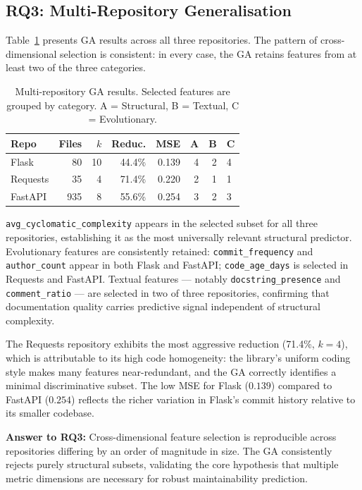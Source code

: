 \documentclass[11pt,a4paper]{article}
\begin{document}
\subsection{RQ3: Multi-Repository Generalisation}
\label{subsec:rq3}

Table~\ref{tab:multirepo} presents GA results across all three repositories.
The pattern of cross-dimensional selection is consistent: in every case, the
GA retains features from at least two of the three categories.

\begin{table}[!htbp]
\centering
\caption{Multi-repository GA results. Selected features are grouped by category.
         A = Structural, B = Textual, C = Evolutionary.}
\label{tab:multirepo}
\renewcommand{\arraystretch}{1.2}
\begin{tabular}{@{}lrrrrrrl@{}}
\toprule
\textbf{Repo} & \textbf{Files} & \textbf{$k$} & \textbf{Reduc.} &
\textbf{MSE} & \textbf{A} & \textbf{B} & \textbf{C} \\
\midrule
Flask    &  80  & 10 & 44.4\% & 0.139 & 4 & 2 & 4 \\
Requests &  35  &  4 & 71.4\% & 0.220 & 2 & 1 & 1 \\
FastAPI  & 935  &  8 & 55.6\% & 0.254 & 3 & 2 & 3 \\
\bottomrule
\end{tabular}
\end{table}

\texttt{avg\_cyclomatic\_complexity} appears in the selected subset for all three
repositories, establishing it as the most universally relevant structural
predictor. Evolutionary features are consistently retained: \texttt{commit\_frequency}
and \texttt{author\_count} appear in both Flask and FastAPI; \texttt{code\_age\_days}
is selected in Requests and FastAPI. Textual features --- notably
\texttt{docstring\_presence} and \texttt{comment\_ratio} --- are selected in two
of three repositories, confirming that documentation quality carries predictive
signal independent of structural complexity.

The Requests repository exhibits the most aggressive reduction (71.4\%, $k=4$),
which is attributable to its high code homogeneity: the library's uniform coding
style makes many features near-redundant, and the GA correctly identifies a
minimal discriminative subset. The low MSE for Flask ($0.139$) compared to
FastAPI ($0.254$) reflects the richer variation in Flask's commit history
relative to its smaller codebase.

\textbf{Answer to RQ3:} Cross-dimensional feature selection is reproducible
across repositories differing by an order of magnitude in size. The GA
consistently rejects purely structural subsets, validating the core hypothesis
that multiple metric dimensions are necessary for robust maintainability
prediction.
\end{document}
